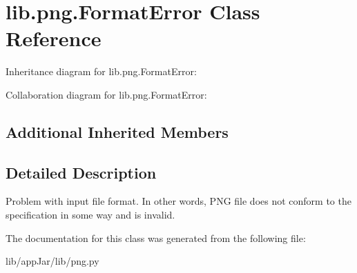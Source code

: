 \hypertarget{classlib_1_1png_1_1_format_error}{}\section{lib.\+png.\+Format\+Error Class Reference}
\label{classlib_1_1png_1_1_format_error}


Inheritance diagram for lib.\+png.\+Format\+Error\+:


Collaboration diagram for lib.\+png.\+Format\+Error\+:
\subsection*{Additional Inherited Members}


\subsection{Detailed Description}
\begin{DoxyVerb}Problem with input file format.  In other words, PNG file does
not conform to the specification in some way and is invalid.
\end{DoxyVerb}
 

The documentation for this class was generated from the following file\+:\begin{DoxyCompactItemize}
\item 
lib/app\+Jar/lib/png.\+py\end{DoxyCompactItemize}
